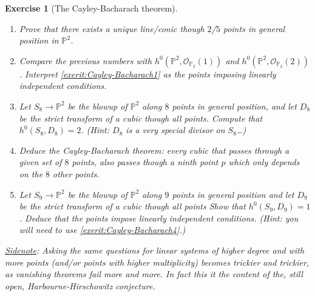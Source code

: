 \documentclass[a4paper,11pt]{amsart}
\newtheorem{exercise}[theorem]{Exercise}
\newcommand{\OO}{\mathcal{O}}
\newcommand{\PP}{\mathbb{P}}
\begin{document}
\begin{exercise}[The Cayley-Bacharach theorem]
	\label{exer:cubicsThought8and9}\leavevmode
	\begin{enumerate}
		\item\label{exerit:Cayley-Bacharach1} Prove that there exists a unique line/conic though $2$/$5$ points in general position in $\PP^2$.
		\item Compare the previous numbers with $h^0(\PP^2,\OO_{\PP_2}(1))$ and $h^0(\PP^2,\OO_{\PP_2}(2))$.
		Interpret \eqref{exerit:Cayley-Bacharach1} as the points imposing \emph{linearly independent conditions}.
		\item Let $S_8 \to \PP^2$ be the blowup of $\PP^2$ along $8$ points in general position, and let $D_8$ be the strict transform of a cubic though all points.
		Compute that $h^0(S_8,D_8) = 2$.
		{\small (Hint: $D_8$ is a \emph{very special} divisor on $S_8$\dots)}
		\item\label{exerit:Cayley-Bacharach4} Deduce the Cayley-Bacharach theorem: %
		every cubic that passes through a given set of $8$ points, also passes though a ninth point $p$ which only depends on the $8$ other points.
		\item Let $S_9 \to \PP^2$ be the blowup of $\PP^2$ along $9$ points in general position and let $D_9$ be the strict transform of a cubic though all points
		Show that $h^0(S_9,D_9) = 1$.
		Deduce that the points impose linearly independent conditions.
		{\small (Hint: you will need to use \eqref{exerit:Cayley-Bacharach4}.)}
	\end{enumerate}
	\underline{Sidenote}:\label{sidenote} Asking the same questions for linear systems of higher degree and with more points (and/or points with higher multiplicity) becomes trickier and trickier, as vanishing theorems fail more and more. 
	In fact this it the content of the, still open, \emph{Harbourne-Hirschowitz conjecture}.
\end{exercise}
\end{document}
